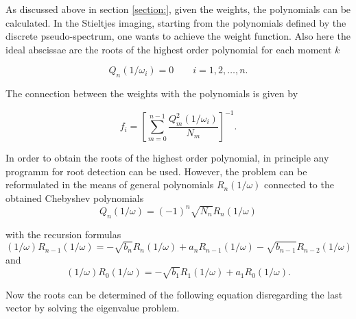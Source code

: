 As discussed above in section \ref{section:}, given the weights, the polynomials
can be calculated. In the Stieltjes imaging, starting from the polynomials
defined by the discrete pseudo-spectrum, one wants to achieve the weight function.
Also here the ideal abscissae are the roots of the highest order polynomial
for each moment $k$

\begin{equation}
  Q_n(1/\omega_i) = 0 \quad\quad i = 1,2,\dots ,n .
\end{equation}

The connection between the weights with the polynomials is given by

\begin{equation}
  f_i = \left[ \sum\limits_{m=0}^{n-1} \frac{Q_m^2(1/\omega_i)}{N_m} \right]^{-1} .
\end{equation}

In order to obtain the roots of the highest order polynomial, in principle
any programm for root detection can be used. However, the problem can
be reformulated in the means of general polynomials $R_n(1/\omega)$ connected
to the obtained Chebyshev polynomials
\begin{equation}
  Q_n(1/\omega) = (-1)^n \sqrt{N_n} R_n(1/\omega)
\end{equation}

with the recursion formulas
\begin{equation}
  (1/\omega)R_{n-1}(1/\omega) = - \sqrt{b_n}R_n(1/\omega) + a_nR_{n-1}(1/\omega)
                                - \sqrt{b_{n-1}} R_{n-2}(1/\omega)
\end{equation}
and
\begin{equation}
  (1/\omega)R_0(1/\omega) = - \sqrt{b_1}R_1(1/\omega) + a_1 R_0(1/\omega) .
\end{equation}

Now the roots can be determined of the following equation disregarding the
last vector by solving the eigenvalue problem.


